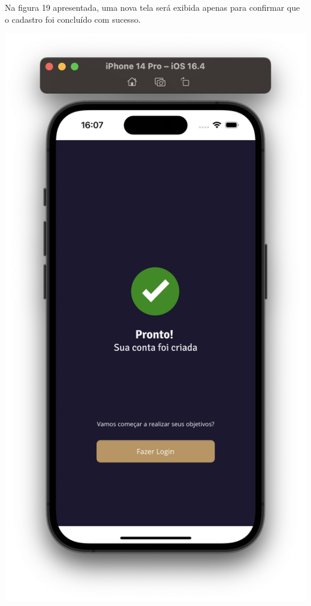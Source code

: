 \vspace{\baselineskip}
\vspace{\baselineskip}
\vspace{\baselineskip}
\vspace{\baselineskip}
\vspace{\baselineskip}
\vspace{\baselineskip}

Na figura 19 apresentada, uma nova tela será exibida apenas para confirmar que o cadastro foi concluído com sucesso.

    \vspace{\baselineskip}
    \begin{center}
        \begin{minipage}{\textwidth}
            \centering
            \includegraphics[scale=0.2]{figs/figura19.png}
            \label{fig:figura19}
        \end{minipage}
    \end{center}  
    
